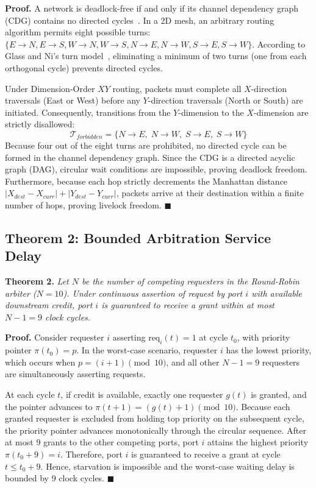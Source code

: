 \documentclass[conference]{IEEEtran}
\begin{document}
\textbf{Proof.} A network is deadlock-free if and only if its channel dependency graph (CDG) contains no directed cycles~\cite{dally2004principles}. In a 2D mesh, an arbitrary routing algorithm permits eight possible turns: $\{E \to N, E \to S, W \to N, W \to S, N \to E, N \to W, S \to E, S \to W\}$. According to Glass and Ni's turn model~\cite{glass1994turn}, eliminating a minimum of two turns (one from each orthogonal cycle) prevents directed cycles.

Under Dimension-Order $XY$ routing, packets must complete all $X$-direction traversals (East or West) before any $Y$-direction traversals (North or South) are initiated. Consequently, transitions from the $Y$-dimension to the $X$-dimension are strictly disallowed:
\begin{equation}
    \mathcal{T}_{forbidden} = \{ N \to E, \; N \to W, \; S \to E, \; S \to W \}
\end{equation}
Because four out of the eight turns are prohibited, no directed cycle can be formed in the channel dependency graph. Since the CDG is a directed acyclic graph (DAG), circular wait conditions are impossible, proving deadlock freedom. Furthermore, because each hop strictly decrements the Manhattan distance $|X_{dest} - X_{curr}| + |Y_{dest} - Y_{curr}|$, packets arrive at their destination within a finite number of hops, proving livelock freedom. $\blacksquare$

\subsection{Theorem 2: Bounded Arbitration Service Delay}
\textbf{Theorem 2.} \textit{Let $N$ be the number of competing requesters in the Round-Robin arbiter ($N = 10$). Under continuous assertion of request by port $i$ with available downstream credit, port $i$ is guaranteed to receive a grant within at most $N-1 = 9$ clock cycles.}

\textbf{Proof.} Consider requester $i$ asserting $\text{req}_i(t) = 1$ at cycle $t_0$, with priority pointer $\pi(t_0) = p$. In the worst-case scenario, requester $i$ has the lowest priority, which occurs when $p = (i + 1) \pmod{10}$, and all other $N-1 = 9$ requesters are simultaneously asserting requests.

At each cycle $t$, if credit is available, exactly one requester $g(t)$ is granted, and the pointer advances to $\pi(t+1) = (g(t) + 1) \pmod{10}$. Because each granted requester is excluded from holding top priority on the subsequent cycle, the priority pointer advances monotonically through the circular sequence. After at most 9 grants to the other competing ports, port $i$ attains the highest priority $\pi(t_0 + 9) = i$. Therefore, port $i$ is guaranteed to receive a grant at cycle $t \le t_0 + 9$. Hence, starvation is impossible and the worst-case waiting delay is bounded by 9 clock cycles. $\blacksquare$
\end{document}
